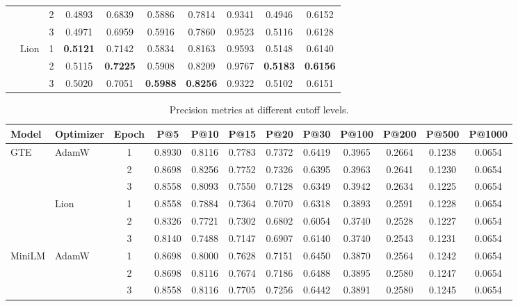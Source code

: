 \begin{table}[t]
\begin{tabular}{llcccccccc}
 & & 2 & 0.4893 & 0.6839 & 0.5886 & 0.7814 & 0.9341 & 0.4946 & 0.6152 \\
 & & 3 & 0.4971 & 0.6959 & 0.5916 & 0.7860 & 0.9523 & 0.5116 & 0.6128 \\
\cmidrule{2-10}
 & \multirow{3}{*}{Lion} 
 & 1 & \textbf{0.5121} & 0.7142 & 0.5834 & 0.8163 & 0.9593 & 0.5148 & 0.6140 \\
 & & 2 & 0.5115 & \textbf{0.7225} & 0.5908 & 0.8209 & 0.9767 & \textbf{0.5183} & \textbf{0.6156} \\
 & & 3 & 0.5020 & 0.7051 & \textbf{0.5988} & \textbf{0.8256} & 0.9322 & 0.5102 & 0.6151 \\
\bottomrule
\end{tabular}
\end{table}


\begin{table}[t]
\centering
\caption{Precision metrics at different cutoff levels.}
\label{tab:precision_metrics}
\small
\begin{tabular}{llcccccccccc}
\toprule
\textbf{Model} & \textbf{Optimizer} & \textbf{Epoch} & \textbf{P@5} & \textbf{P@10} & \textbf{P@15} & \textbf{P@20} & \textbf{P@30} & \textbf{P@100} & \textbf{P@200} & \textbf{P@500} & \textbf{P@1000}\\
\midrule
\multirow{6}{*}{GTE} & \multirow{3}{*}{AdamW} 
 & 1 & 0.8930 & 0.8116 & 0.7783 & 0.7372 & 0.6419 & 0.3965 & 0.2664 & 0.1238 & 0.0654 \\
 & & 2 & 0.8698 & 0.8256 & 0.7752 & 0.7326 & 0.6395 & 0.3963 & 0.2641 & 0.1230 & 0.0654 \\
 & & 3 & 0.8558 & 0.8093 & 0.7550 & 0.7128 & 0.6349 & 0.3942 & 0.2634 & 0.1225 & 0.0654 \\
\cmidrule{2-12}
 & \multirow{3}{*}{Lion} 
 & 1 & 0.8558 & 0.7884 & 0.7364 & 0.7070 & 0.6318 & 0.3893 & 0.2591 & 0.1228 & 0.0654 \\
 & & 2 & 0.8326 & 0.7721 & 0.7302 & 0.6802 & 0.6054 & 0.3740 & 0.2528 & 0.1227 & 0.0654 \\
 & & 3 & 0.8140 & 0.7488 & 0.7147 & 0.6907 & 0.6140 & 0.3740 & 0.2543 & 0.1231 & 0.0654 \\
\midrule
\multirow{6}{*}{MiniLM} & \multirow{3}{*}{AdamW} 
 & 1 & 0.8698 & 0.8000 & 0.7628 & 0.7151 & 0.6450 & 0.3870 & 0.2564 & 0.1242 & 0.0654 \\
 & & 2 & 0.8698 & 0.8116 & 0.7674 & 0.7186 & 0.6488 & 0.3895 & 0.2580 & 0.1247 & 0.0654 \\
 & & 3 & 0.8558 & 0.8116 & 0.7705 & 0.7256 & 0.6442 & 0.3891 & 0.2580 & 0.1245 & 0.0654 \\

\end{tabular}
\end{table}
